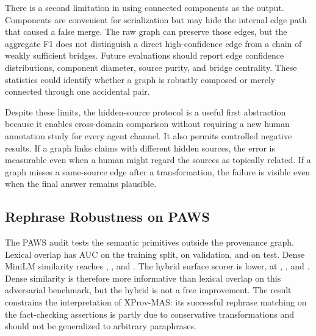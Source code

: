 \documentclass{ieeeaccess}
\begin{document}
There is a second limitation in using connected components as the output. Components are convenient for serialization but may hide the internal edge path that caused a false merge. The raw graph can preserve those edges, but the aggregate F1 does not distinguish a direct high-confidence edge from a chain of weakly sufficient bridges. Future evaluations should report edge confidence distributions, component diameter, source purity, and bridge centrality. These statistics could identify whether a graph is robustly composed or merely connected through one accidental pair.

Despite these limits, the hidden-source protocol is a useful first abstraction because it enables cross-domain comparison without requiring a new human annotation study for every agent channel. It also permits controlled negative results. If a graph links claims with different hidden sources, the error is measurable even when a human might regard the sources as topically related. If a graph misses a same-source edge after a transformation, the failure is visible even when the final answer remains plausible.

\begin{table}[!ht]
\centering
\caption{Record-level 95\% bootstrap intervals for pairwise F1.}
\label{tab:uncertainty}
\end{table}

\subsection{Rephrase Robustness on PAWS}
The PAWS audit tests the semantic primitives outside the provenance graph. Lexical overlap has AUC \PAWSTrainLexAUC on the training split, \PAWSValidationLexAUC on validation, and \PAWSTestLexAUC on test. Dense MiniLM similarity reaches \PAWSTrainDenseAUC, \PAWSValidationDenseAUC, and \PAWSTestDenseAUC. The hybrid surface scorer is lower, at \PAWSTrainHybridAUC, \PAWSValidationHybridAUC, and \PAWSTestHybridAUC. Dense similarity is therefore more informative than lexical overlap on this adversarial benchmark, but the hybrid is not a free improvement. The result constrains the interpretation of XProv-MAS: its successful rephrase matching on the fact-checking assertions is partly due to conservative transformations and should not be generalized to arbitrary paraphrases.
\end{document}
